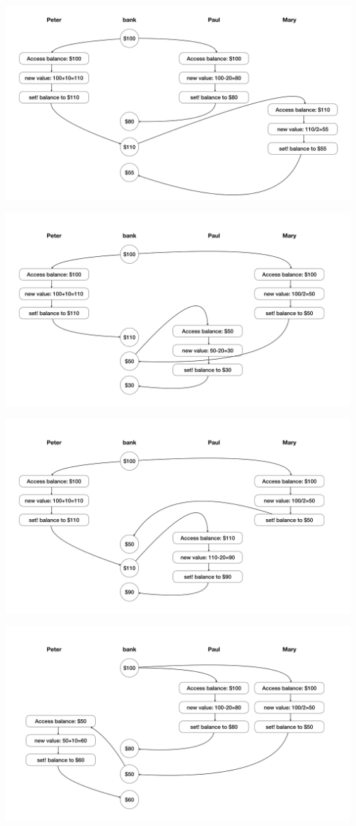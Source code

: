\documentclass[11pt, oneside]{article}
\begin{document}
\begin{center}
    \includegraphics[width=.8\textwidth,height=.8\textheight,keepaspectratio]{3.png}
\end{center}

\begin{center}
    \includegraphics[width=.8\textwidth,height=.8\textheight,keepaspectratio]{4.png}
\end{center}

\begin{center}
    \includegraphics[width=.8\textwidth,height=.8\textheight,keepaspectratio]{5.png}
\end{center}

\begin{center}
    \includegraphics[width=.8\textwidth,height=.8\textheight,keepaspectratio]{6.png}
\end{center}
\end{document}
